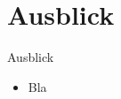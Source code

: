 \section{Ausblick}

\begin{slide}{Ausblick}
	\begin{itemize}
		\item Bla
	\end{itemize}
\end{slide}
